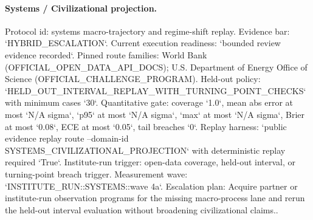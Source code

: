 \paragraph{Systems / Civilizational projection.}
Protocol id: systems macro-trajectory and regime-shift replay. Evidence bar: `HYBRID\_ESCALATION`. Current execution readiness: `bounded review evidence recorded`.
Pinned route families: World Bank (OFFICIAL\_OPEN\_DATA\_API\_DOCS); U.S. Department of Energy Office of Science (OFFICIAL\_CHALLENGE\_PROGRAM).
Held-out policy: `HELD\_OUT\_INTERVAL\_REPLAY\_WITH\_TURNING\_POINT\_CHECKS` with minimum cases `30`.
Quantitative gate: coverage `1.0`, mean abs error at most `N/A sigma`, `p95` at most `N/A sigma`, `max` at most `N/A sigma`, Brier at most `0.08`, ECE at most `0.05`, tail breaches `0`.
Replay harness: `public evidence replay route --domain-id SYSTEMS\_CIVILIZATIONAL\_PROJECTION` with deterministic replay required `True`.
Institute-run trigger: open-data coverage, held-out interval, or turning-point breach trigger. Measurement wave: `INSTITUTE\_RUN::SYSTEMS::wave 4a`.
Escalation plan: Acquire partner or institute-run observation programs for the missing macro-process lane and rerun the held-out interval evaluation without broadening civilizational claims..

